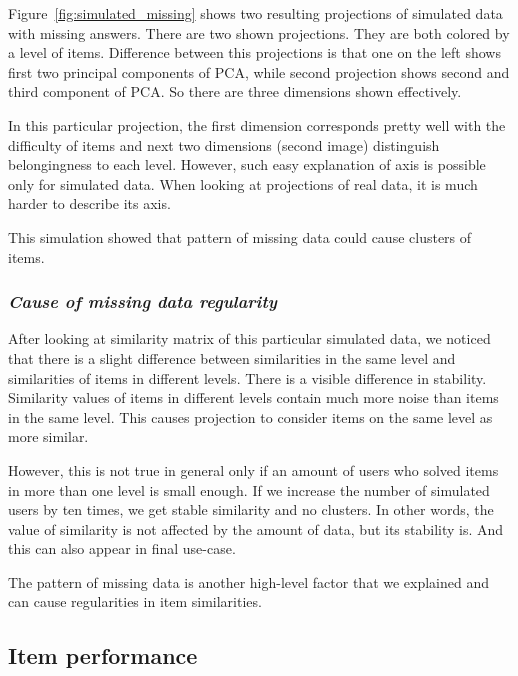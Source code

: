 \documentclass[
  printed, %
  table,   %
  nolof,     %
  nolot,     %
  color,
  final,
  nocover
]{fithesis3}
\begin{document}
Figure~\ref{fig:simulated_missing} shows two resulting projections of simulated data with missing answers. There are two shown projections. They are both colored by a level of items. Difference between this projections is that one on the left shows first two principal components of PCA, while second projection shows second and third component of PCA. So there are three dimensions shown effectively.

In this particular projection, the first dimension corresponds pretty well with the difficulty of items and next two dimensions (second image) distinguish belongingness to each level. However, such easy explanation of axis is possible only for simulated data. When looking at projections of real data, it is much harder to describe its axis.

This simulation showed that pattern of missing data could cause clusters of items.


\subsubsection{\textit{Cause of missing data regularity}}\label{cause-of-missing-data-regularity}

After looking at similarity matrix of this particular simulated data, we noticed that there is a slight difference between similarities in the same level and similarities of items in different levels. There is a visible difference in stability. Similarity values of items in different levels contain much more noise than items in the same level. This causes projection to consider items on the same level as more similar.

However, this is not true in general only if an amount of users who solved items in more than one level is small enough. If we increase the number of simulated users by ten times, we get stable similarity and no clusters. In other words, the value of similarity is not affected by the amount of data, but its stability is. And this can also appear in final use-case.

The pattern of missing data is another high-level factor that we explained and can cause regularities in item similarities.


\subsection{Item performance}\label{item-performance}
\end{document}
